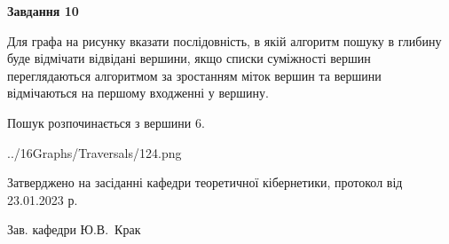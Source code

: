 \documentclass[12pt, ukrainian]{article}
\begin{document}
{\begin {large}
{\begin {center}\textbf{Завдання 10}\end {center}}\par
Для графа на рисунку вказати послідовність, в якій алгоритм пошуку в глибину буде відмічати відвідані вершини, якщо списки суміжності вершин переглядаються алгоритмом за зростанням міток вершин та вершини відмічаються на першому вход\-женні у вершину.\par
Пошук розпочинається з вершини 6.\par

\begin{center}
	{../16Graphs/Traversals/124.png}
\end{center}\par
\newpage


\end {large}
}
{\smallskip \begin {small} Затверджено на засіданні кафедри теоретичної кібернетики, протокол  від   23.01.2023 р.\par\smallskip\smallskip
{\parbox {6.5 cm}{Зав. кафедри \dotfill Ю.В.~Крак}} \end{small}}
\end{document}
